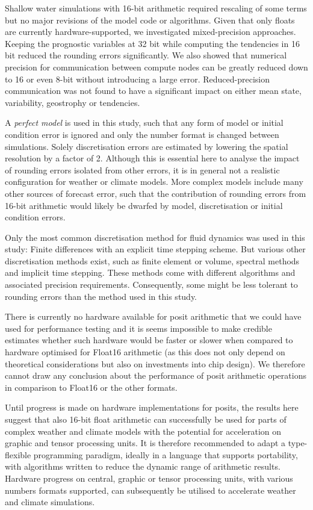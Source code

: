 Shallow water simulations with 16-bit arithmetic required rescaling of some terms but no major revisions of the model code
or algorithms. Given that only floats are currently hardware-supported, we investigated mixed-precision approaches.
Keeping the prognostic variables at 32 bit while computing the tendencies in 16 bit reduced the rounding errors significantly.
We also showed that numerical precision for communication between compute nodes can be greatly reduced down to 16 or
even 8-bit without introducing a large error. Reduced-precision communication was not found to have a significant impact on
either mean state, variability, geostrophy or tendencies.

A \emph{perfect model} is used in this study, such that any form of model or initial condition error is ignored and only the number
format is changed between simulations. Solely discretisation errors are estimated by lowering the spatial resolution by a factor of 2.
Although this is essential here to analyse the impact of rounding errors isolated from other errors, it is in general not a realistic
configuration for weather or climate models. More complex models include many other sources of forecast error, such that the
contribution of rounding errors from 16-bit arithmetic would likely be dwarfed by model, discretisation or initial condition errors.

Only the most common discretisation method for fluid dynamics was used in this study: Finite differences with an explicit time
stepping scheme. But various other discretisation methods exist, such as finite element or volume, spectral methods and
implicit time stepping. These methods come with different algorithms and associated precision requirements. Consequently,
some might be less tolerant to rounding errors than the method used in this study.

There is currently no hardware available for posit arithmetic that we could have used for performance testing and it is seems
impossible to make credible estimates whether such hardware would be faster or slower when compared to hardware optimised
for Float16 arithmetic (as this does not only depend on theoretical considerations but also on investments into chip design).
We therefore cannot draw any conclusion about the performance of posit arithmetic operations in comparison to Float16 or
the other formats.

Until progress is made on hardware implementations for posits, the results here suggest that also 16-bit float arithmetic can
successfully be used for parts of complex weather and climate models with the potential for acceleration on graphic and tensor
processing units. It is therefore recommended to adapt a type-flexible programming paradigm, ideally in a language that supports
portability, with algorithms written to reduce the dynamic range of arithmetic results. Hardware progress on central, graphic or
tensor processing units, with various numbers formats supported, can subsequently be utilised to accelerate weather and
climate simulations.
